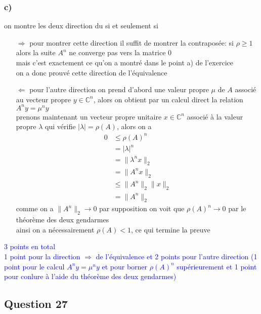 \documentclass[11pt, a4paper, oneside]{article}
\begin{document}
\subsubsection*{c)} 
on montre les deux direction du si et seulement si
\begin{itemize}
    \item [$\Longrightarrow$] pour montrer cette direction il suffit de montrer la contraposée: si $\rho \geq 1$ alors la suite $A^n$ ne converge pas vers la matrice 0 \\
    mais c'est exactement ce qu'on a montré dans le point a) de l'exercice \\
    {\tiny on a donc prouvé cette direction de l'équivalence}
    \item [$\Longleftarrow$] pour l'autre direction {\tiny on prend d'abord une valeur propre $\mu$ de $A$ associé au vecteur propre $y \in \mathbb{C}^n$, alors on obtient par un calcul direct la relation $A^ny = \mu^n y$} \\
    prenons maintenant un vecteur propre unitaire $x \in \mathbb{C}^n$ associé à la valeur propre $\lambda$ qui vérifie $|\lambda| = \rho(A)$, alors on a
    \begin{align*}
        0 &\leq \rho(A)^n \\
        &= |\lambda|^n \\
        &= \lVert \lambda^nx \rVert_2 \\
        &= \lVert A^nx \rVert_2 \\
        &\leq \lVert A^n \rVert_2 \lVert x \rVert_2 \\
        &= \lVert A^n \rVert_2
    \end{align*}
    comme on a $\lVert A^n \rVert_2 \rightarrow 0$ par supposition on voit que $\rho(A)^n \rightarrow 0$ par le théorème des deux gendarmes \\
    ainsi on a nécessairement $\rho(A)<1$, {\tiny ce qui termine la preuve}
\end{itemize}
\textcolor{blue}{3 points en total \\ 1 point pour la direction $\Longrightarrow$ de l'équivalence et 2 points pour l'autre direction (1 point pour le calcul $A^ny = \mu^n y$ et pour borner $\rho(A)^n$ supérieurement et 1 point pour conlure à l'aide du théorème des deux gendarmes)} 
    


\newpage
\subsection*{Question 27}
\end{document}
